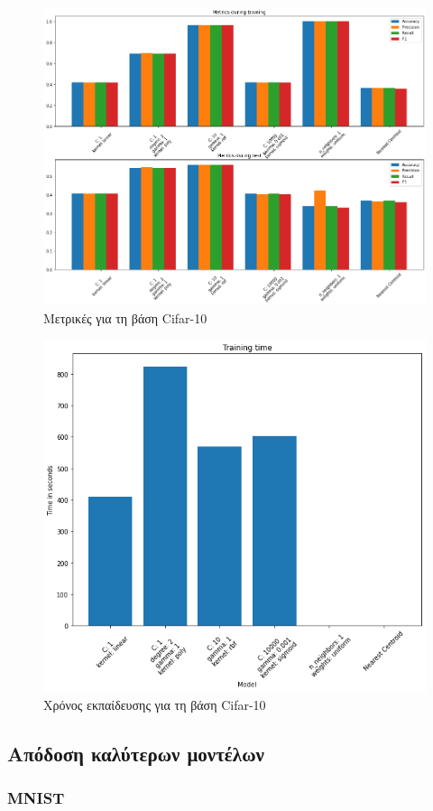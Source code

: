 \documentclass[a4paper]{article}
\begin{document}
\begin{figure}[H]
    \centering
    \includegraphics[width=\linewidth]{figures/cifar/all_metrics.png}
    \caption{Μετρικές για τη βάση Cifar-10}
    \label{fig:cifar_metrics}
\end{figure}

\begin{figure}[H]
    \centering
    \includegraphics[width=0.6\linewidth]{figures/cifar/training_time.png}
    \caption{Χρόνος εκπαίδευσης για τη βάση Cifar-10}
    \label{fig:cifar_training_times}
\end{figure}

\subsection{Απόδοση καλύτερων μοντέλων}

\subsubsection{MNIST}
\end{document}
